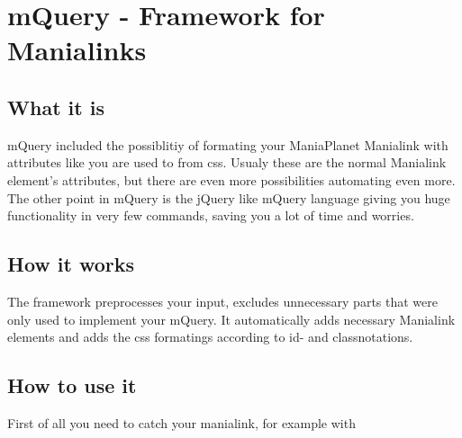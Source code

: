 \documentclass[10pt,a4paper]{article}
\begin{document}
\section{mQuery - Framework for
Manialinks}\label{mquery---framework-for-manialinks}

\subsection{What it is}\label{what-it-is}

mQuery included the possiblitiy of formating your ManiaPlanet Manialink
with attributes like you are used to from css. Usualy these are the
normal Manialink element's attributes, but there are even more
possibilities automating even more. The other point in mQuery is the
jQuery like mQuery language giving you huge functionality in very few
commands, saving you a lot of time and worries.

\subsection{How it works}\label{how-it-works}

The framework preprocesses your input, excludes unnecessary parts that
were only used to implement your mQuery. It automatically adds necessary
Manialink elements and adds the css formatings according to id- and
classnotations.

\subsection{How to use it}\label{how-to-use-it}

First of all you need to catch your manialink, for example with

\begin{Shaded}
\begin{Highlighting}[]
\OtherTok{();}  
\OtherTok{(}\OtherTok{);}  
 \NormalTok{= }\OtherTok{();}    
\OtherTok{();}  
 \NormalTok{= } \OtherTok{(}\OtherTok{);}  
\OtherTok{();}                                      
\OtherTok{();}                                           
\end{Highlighting}
\end{Shaded}
\end{document}
